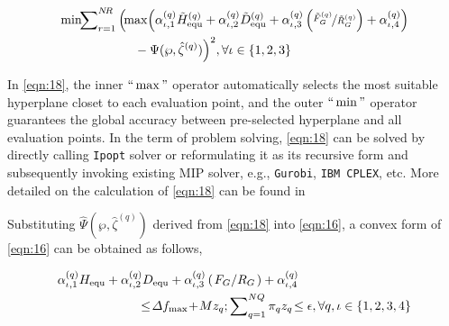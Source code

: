 \documentclass[lettersize,journal]{IEEEtran}
\newcommand{\slfrac}[2]{\left.#1\middle/#2\right.}
\def\code#1{\texttt{#1}}
\begin{document}
\vspace{-0.125in}
\begin{small}
	\begin{align}\label{eqn:18}
		 & \min\!\!\sum\nolimits_{r=1}^{N\!R}\left( \!\max \!\left(\alpha_{\iota,1}^{(q)}\tilde{H}_{\text{equ}}^{(q)} + \alpha_{\iota,2}^{(q)} \tilde{D}_{\text{equ}}^{(q)} + \alpha_{\iota,3}^{(q)}\left(\nicefrac{\tilde{F}_G^{(q)}}{\tilde{R}_G^{(q)} }\right) + \alpha_{\iota,4}^{(q)} \right)\right.\notag \\
		 & \qquad\qquad \qquad - \Psi (\wp, \hat{\zeta}^{(q)})\Bigr)^{2}, \forall \iota\in\{1,2,3\}
	\end{align}
\end{small}

In \cref{eqn:18}, the inner $``\max"$ operator automatically selects the most suitable hyperplane closet to each evaluation point, and the outer $``\min"$ operator guarantees the global accuracy between pre-selected hyperplane and all evaluation points. In the term of problem solving, \eqref{eqn:18} can be solved by directly calling \code{Ipopt} solver or reformulating it as its recursive form and subsequently invoking existing MIP solver, e.g., \code{Gurobi}, \code{IBM CPLEX}, etc. More detailed on the calculation of \eqref{eqn:18} can be found in \cite{ding2021two,zhang2020modeling}

Substituting $\hat{\Psi}(\wp, \hat{\zeta}^{(q)})$ derived from \cref{eqn:18} into \cref{eqn:16}, a convex form of \eqref{eqn:16} can be obtained as follows,

\vspace{-0.125in}
\begin{small}
	\begin{align}\label{eqn:19}
		 & \alpha_{\iota,1}^{(q)}{H}_{\text{equ}} + \alpha_{\iota,2}^{(q)} {D}_{\text{equ}} + \alpha_{\iota,3}^{(q)}\left(\slfrac{{F}_G}{{R}_G }\right) + \alpha_{\iota,4}^{(q)}  \\
		 & \qquad \qquad \qquad \,\, \leq \!\varDelta f_{\text{max}} \!+\! M z_{q}; \sum\nolimits_{q=1}^{NQ}  \pi_{q} z_{q}\! \leq \epsilon,\forall q \notag, \iota\in\{1,2,3,4\}
	\end{align}
\end{small}

\end{document}
